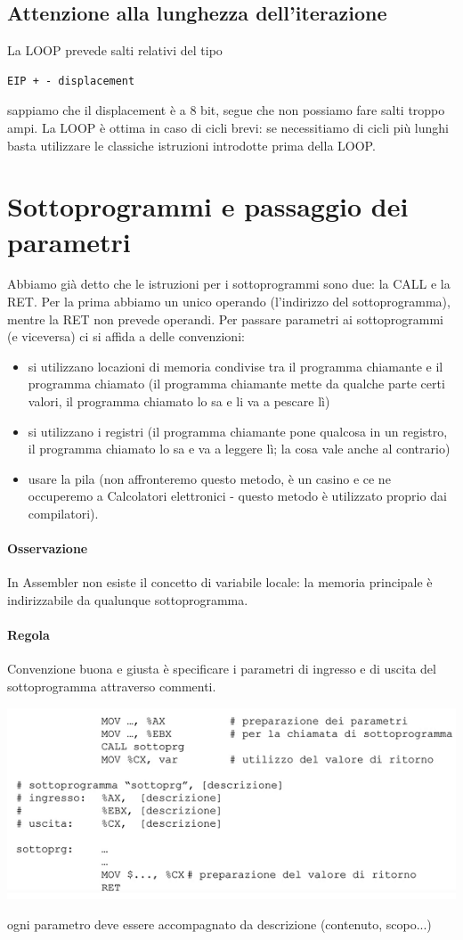 \documentclass[11pt]{report}
\begin{document}
\subsection{Attenzione alla lunghezza dell'iterazione}
La LOOP prevede salti relativi del tipo 
\begin{verbatim}
EIP + - displacement
\end{verbatim}
sappiamo che il displacement è a 8 bit, segue che non possiamo fare salti troppo ampi. La LOOP è ottima in caso di cicli brevi: se necessitiamo di cicli più lunghi basta utilizzare le classiche istruzioni introdotte prima della LOOP.

\section{Sottoprogrammi e passaggio dei parametri}
Abbiamo già detto che le istruzioni per i sottoprogrammi sono due: la CALL e la RET. Per la prima abbiamo un unico operando (l'indirizzo del sottoprogramma), mentre la RET non prevede operandi.  Per passare parametri ai sottoprogrammi (e viceversa) ci si affida a delle convenzioni:
\begin{itemize}
\item si utilizzano locazioni di memoria condivise tra il programma chiamante e il programma chiamato (il programma chiamante mette da qualche parte certi valori, il programma chiamato lo sa e li va a pescare lì)
\item si utilizzano i registri (il programma chiamante pone qualcosa in un registro, il programma chiamato lo sa e va a leggere lì; la cosa vale anche al contrario)
\item usare la pila (non affronteremo questo metodo, è un casino e ce ne occuperemo a Calcolatori elettronici - questo metodo è utilizzato proprio dai compilatori).
\end{itemize}
\paragraph{Osservazione} In Assembler non esiste il concetto di variabile locale: la memoria principale è indirizzabile da qualunque sottoprogramma.
\paragraph{Regola} Convenzione buona e giusta è specificare i parametri di ingresso e di uscita del sottoprogramma attraverso commenti.
\begin{center}
\includegraphics{img/57.PNG}
\end{center}
ogni parametro deve essere accompagnato da descrizione (contenuto, scopo...)
\end{document}
